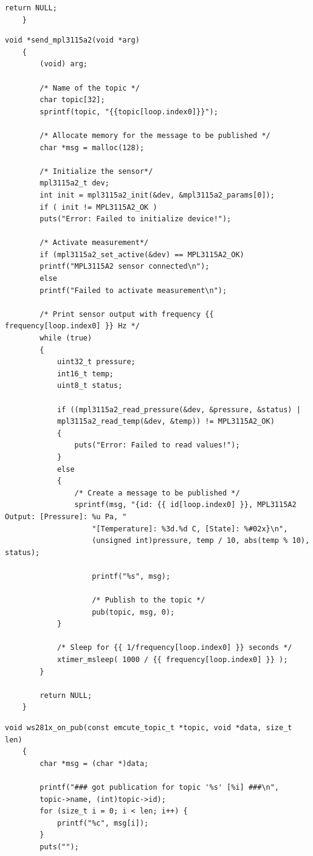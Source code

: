 \begin{appendices}
\begin{lstlisting}[style=CStyle, title={Πρότυπο παραγωγής κώδικα για αισθητήρα BME680}]
		return NULL;
	}
\end{lstlisting}

\newpage

\begin{lstlisting}[style=CStyle, title={Πρότυπο παραγωγής κώδικα για αισθητήρα MPL3115A2}]
	void *send_mpl3115a2(void *arg)
	{
		(void) arg;
		
		/* Name of the topic */
		char topic[32];
		sprintf(topic, "{{topic[loop.index0]}}");
		
		/* Allocate memory for the message to be published */
		char *msg = malloc(128);
		
		/* Initialize the sensor*/
		mpl3115a2_t dev;
		int init = mpl3115a2_init(&dev, &mpl3115a2_params[0]);
		if ( init != MPL3115A2_OK )
		puts("Error: Failed to initialize device!");
		
		/* Activate measurement*/
		if (mpl3115a2_set_active(&dev) == MPL3115A2_OK)
		printf("MPL3115A2 sensor connected\n");
		else 
		printf("Failed to activate measurement\n");
		
		/* Print sensor output with frequency {{ frequency[loop.index0] }} Hz */
		while (true)
		{
			uint32_t pressure;
			int16_t temp;
			uint8_t status;
			
			if ((mpl3115a2_read_pressure(&dev, &pressure, &status) |
			mpl3115a2_read_temp(&dev, &temp)) != MPL3115A2_OK)
			{
				puts("Error: Failed to read values!");
			}
			else
			{
				/* Create a message to be published */
				sprintf(msg, "{id: {{ id[loop.index0] }}, MPL3115A2 Output: [Pressure]: %u Pa, "
					"[Temperature]: %3d.%d C, [State]: %#02x}\n",
					(unsigned int)pressure, temp / 10, abs(temp % 10), status);
					
					printf("%s", msg);
					
					/* Publish to the topic */
					pub(topic, msg, 0);
			}
				
			/* Sleep for {{ 1/frequency[loop.index0] }} seconds */
			xtimer_msleep( 1000 / {{ frequency[loop.index0] }} );
		}
			
		return NULL;
	}
\end{lstlisting}

\begin{lstlisting}[style=CStyle, title={Πρότυπο παραγωγής κώδικα για ενεργοποιητή WS281x}]
	void ws281x_on_pub(const emcute_topic_t *topic, void *data, size_t len)
	{
		char *msg = (char *)data;
		
		printf("### got publication for topic '%s' [%i] ###\n",
		topic->name, (int)topic->id);
		for (size_t i = 0; i < len; i++) {
			printf("%c", msg[i]);
		}
		puts("");
		

\end{lstlisting}
\end{appendices}
